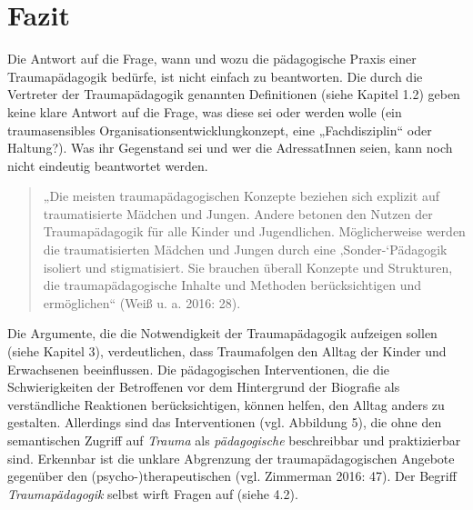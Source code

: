 \clearpage
\section{Fazit}
Die Antwort auf die Frage, wann und wozu die pädagogische Praxis einer Traumap{\"a}dagogik bedürfe, ist nicht einfach zu beantworten. Die durch die Vertreter der Traumap{\"a}dagogik genannten Definitionen (siehe Kapitel 1.2) geben keine klare Antwort auf die Frage, was diese sei oder werden wolle (ein traumasensibles Organisationsentwicklungkonzept, eine „Fachdisziplin“ oder Haltung?). Was ihr Gegenstand sei und wer die AdressatInnen seien, kann noch nicht eindeutig beantwortet werden.

\begin{quote}
\small{„Die meisten traumap{\"a}dagogischen Konzepte beziehen sich explizit auf traumatisierte M{\"a}dchen und Jungen. Andere betonen den Nutzen der Traumap{\"a}dagogik f{\"u}r alle Kinder und Jugendlichen. M{\"o}glicherweise werden die traumatisierten M{\"a}dchen und Jungen durch eine ‚Sonder-‘P{\"a}dagogik isoliert und stigmatisiert. Sie brauchen {\"u}berall Konzepte und Strukturen, die traumap{\"a}dagogische Inhalte und Methoden ber{\"u}cksichtigen und erm{\"o}glichen“ (Weiß u. a. 2016: 28).}
\end{quote}

Die Argumente, die die Notwendigkeit der Traumap{\"a}dagogik aufzeigen sollen (siehe Kapitel 3), verdeutlichen, dass Traumafolgen den Alltag der Kinder und Erwachsenen beeinflussen. Die pädagogischen Interventionen, die die Schwierigkeiten der Betroffenen vor dem Hintergrund der Biografie als verständliche Reaktionen berücksichtigen, können helfen, den Alltag anders zu gestalten. Allerdings sind das Interventionen (vgl. Abbildung 5), die ohne den semantischen Zugriff auf \textit{Trauma} als \textit{pädagogische} beschreibbar und praktizierbar sind. Erkennbar ist die unklare Abgrenzung der traumapädagogischen Angebote gegenüber den (psycho-)therapeutischen (vgl. Zimmerman 2016: 47). Der Begriff \textit{Traumapädagogik} selbst wirft Fragen auf (siehe 4.2).

